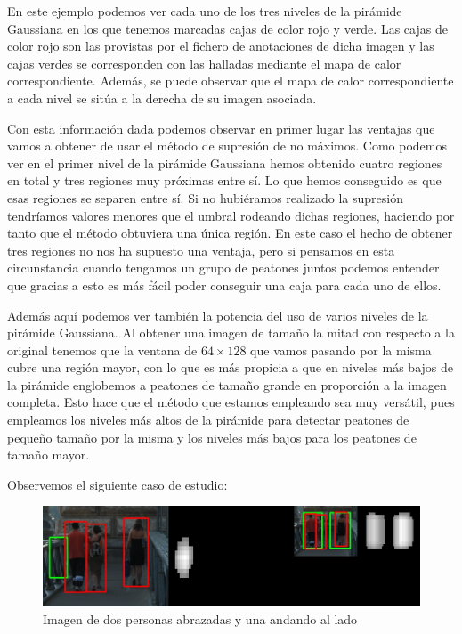 \documentclass[a4paper,12pt]{article}
\begin{document}
En este ejemplo podemos ver cada uno de los tres niveles de la pirámide Gaussiana en los que tenemos marcadas cajas de color rojo y verde. Las cajas de color rojo son las provistas por el fichero de anotaciones de dicha imagen y las cajas verdes se corresponden con las halladas mediante el mapa de calor correspondiente. Además, se puede observar que el mapa de calor correspondiente a cada nivel se sitúa a la derecha de su imagen asociada.

Con esta información dada podemos observar en primer lugar las ventajas que vamos a obtener de usar el método de supresión de no máximos. Como podemos ver en el primer nivel de la pirámide Gaussiana hemos obtenido cuatro regiones en total y tres regiones muy próximas entre sí. Lo que hemos conseguido es que esas regiones se separen entre sí. Si no hubiéramos realizado la supresión tendríamos valores menores que el umbral rodeando dichas regiones, haciendo por tanto que el método obtuviera una única región. En este caso el hecho de obtener tres regiones no nos ha supuesto una ventaja, pero si pensamos en esta circunstancia cuando tengamos un grupo de peatones juntos podemos entender que gracias a esto es más fácil poder conseguir una caja para cada uno de ellos. 

Además aquí podemos ver también la potencia del uso de varios niveles de la pirámide Gaussiana. Al obtener una imagen de tamaño la mitad con respecto a la original tenemos que la ventana de $64\times 128$ que vamos pasando por la misma cubre una región mayor, con lo que es más propicia a que en niveles más bajos de la pirámide englobemos a peatones de tamaño grande en proporción a la imagen completa. Esto hace que el método que estamos empleando sea muy versátil, pues empleamos los niveles más altos de la pirámide para detectar peatones de pequeño tamaño por la misma y los niveles más bajos para los peatones de tamaño mayor.

Observemos el siguiente caso de estudio:

\begin{figure}[H]
	\includegraphics[scale=0.3]{./Imagenes/test02.jpg}
	\caption{Imagen de dos personas abrazadas y una andando al lado}
\end{figure}
\end{document}
